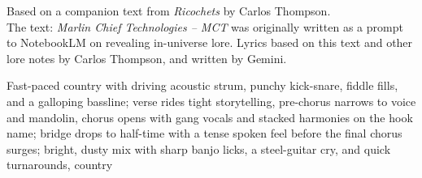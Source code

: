 

\begin{notes}
Based on a companion text from \emph{Ricochets} by Carlos Thompson.\\
The text: \emph{Marlin Chief Technologies -- MCT} was originally written as a prompt to NotebookLM on revealing in-universe lore. %
Lyrics based on this text and other lore notes by Carlos Thompson, and written by Gemini.
\end{notes}

\begin{style}
Fast-paced country with driving acoustic strum, punchy kick-snare, fiddle fills, and a galloping bassline; verse rides tight storytelling, pre-chorus narrows to voice and mandolin, chorus opens with gang vocals and stacked harmonies on the hook name; bridge drops to half-time with a tense spoken feel before the final chorus surges; bright, dusty mix with sharp banjo licks, a steel-guitar cry, and quick turnarounds, country
\end{style}

